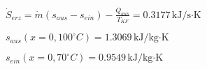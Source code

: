 \( \dot{S}_{erz} = \dot{m} (s_{aus} - s_{ein}) - \frac{\dot{Q}_{aus}}{T_{KF}} = 0.3177 \, \text{kJ/s·K} \)  

\( s_{aus} (x = 0, 100^\circ C) = 1.3069 \, \text{kJ/kg·K} \)  

\( s_{ein} (x = 0, 70^\circ C) = 0.9549 \, \text{kJ/kg·K} \)